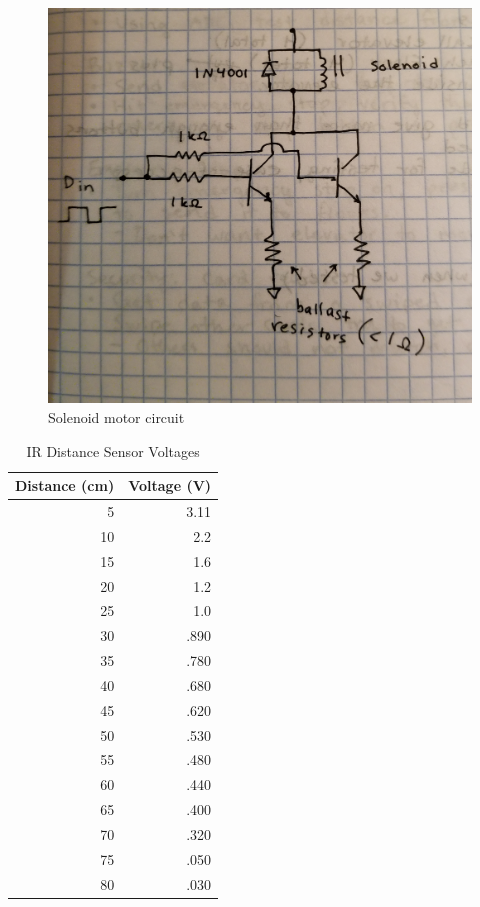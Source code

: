 \documentclass{article}
\begin{document}
	\begin{figure}[h!]
		\includegraphics[width=\linewidth]{solenoid.jpg}
		\caption{Solenoid motor circuit}
		\label{fig:solenoid}
	\end{figure}
	
    \begin{table}[h!]
  	    \begin{center}
            \caption{IR Distance Sensor Voltages}
    		\label{tab:table2}
    		\begin{tabular}{r|r}
      			\textbf{Distance (cm)} & \textbf{Voltage (V)} \\
			    \hline
      			5 & 3.11\\
      			10 & 2.2\\
      			15 & 1.6\\
      			20 & 1.2\\
				25 & 1.0\\
				30 & .890 \\
				35 & .780 \\
				40 & .680 \\
				45 & .620 \\
				50 & .530 \\
				55 & .480 \\
				60 & .440 \\
				65 & .400 \\
				70 & .320 \\
				75 & .050 \\
				80 & .030 \\
   			\end{tabular}
  	    \end{center}
	\end{table}
	
\end{document}
